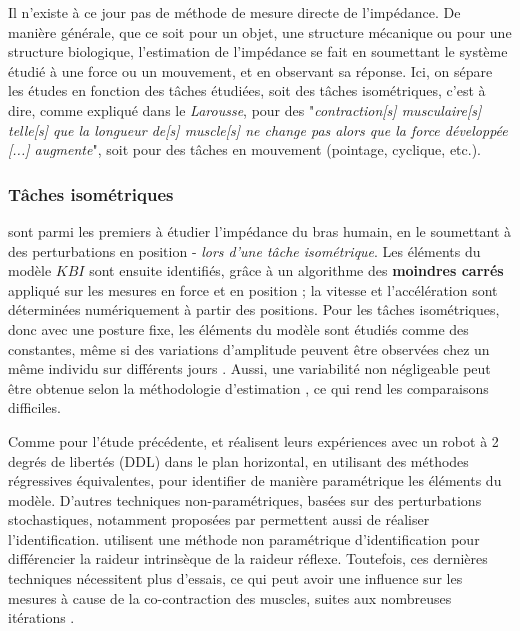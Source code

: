 \documentclass[12pt, a4paper]{article} %
\begin{document}
Il n'existe à ce jour pas de méthode de mesure directe de l'impédance. De manière générale, que ce soit pour un objet, une structure mécanique ou pour une structure biologique, l'estimation de l'impédance se fait en soumettant le système étudié à une force ou un mouvement, et en observant sa réponse. Ici, on sépare les études en fonction des tâches étudiées, soit des tâches isométriques, c'est à dire, comme expliqué dans le \textit{Larousse}, pour des "\textit{contraction[s] musculaire[s] telle[s] que la longueur de[s] muscle[s] ne change pas alors que la force développée [...] augmente}", soit pour des tâches en mouvement (pointage, cyclique, etc.).

\subsubsection{Tâches isométriques}

\cite{mussa-ivaldi_neural_1985} sont parmi les premiers à étudier l'impédance du bras humain, en le soumettant à des perturbations en position - \textit{lors d'une tâche isométrique}. Les éléments du modèle $KBI$ sont ensuite identifiés, grâce à un algorithme des \textbf{moindres carrés} appliqué sur les mesures en force et en position ; la vitesse et l'accélération sont déterminées numériquement à partir des positions. Pour les tâches isométriques, donc avec une posture fixe, les éléments du modèle sont étudiés comme des constantes, même si des variations d'amplitude peuvent être observées chez un même individu sur différents jours \citep{mussa-ivaldi_neural_1985}. Aussi, une variabilité non négligeable peut être obtenue selon la méthodologie d'estimation \citep{gurram_mechanical_1995}, ce qui rend les comparaisons difficiles.

\newlineBlank

Comme pour l'étude précédente, \cite{dolan_dynamic_1993} et \cite{tsuji_human_1995} réalisent leurs expériences avec un robot à 2 degrés de libertés (DDL) dans le plan horizontal, en utilisant des méthodes régressives équivalentes, pour identifier de manière paramétrique les éléments du modèle. D'autres techniques non-paramétriques, basées sur des perturbations stochastiques, notamment proposées par \cite{perreault_multiple-input_1999, perreault_effects_2001} permettent aussi de réaliser l'identification. \cite{ludvig_identification_2011} utilisent une méthode non paramétrique d'identification pour différencier la raideur intrinsèque de la raideur réflexe. Toutefois, ces dernières techniques nécessitent plus d'essais, ce qui peut avoir une influence sur les mesures à cause de la co-contraction des muscles, suites aux nombreuses itérations \citep{piovesan_measuring_2012}.
\end{document}
